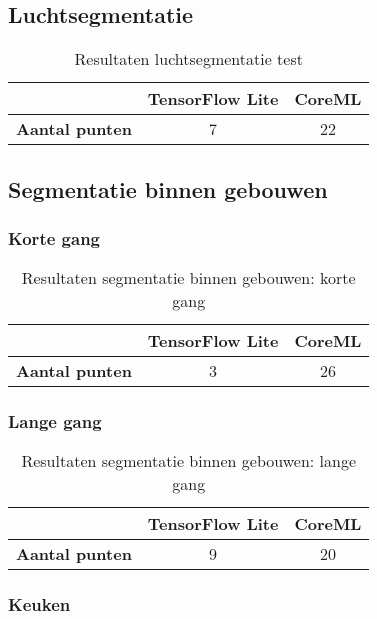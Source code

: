\subsection{Luchtsegmentatie}


\begin{table}[H]
	\centering
	\begin{tabular}{|c|c|c|}
		\hline
		& \textbf{TensorFlow Lite} & \textbf{CoreML} \\ \hline
		\textbf{Aantal punten} & 7                        & 22              \\ \hline
	\end{tabular}
	\caption{Resultaten luchtsegmentatie test}
\end{table}
\subsection{Segmentatie binnen gebouwen}

\subsubsection{Korte gang}
\begin{table}[H]
	\centering
	\begin{tabular}{|c|c|c|}
		\hline
		& \textbf{TensorFlow Lite} & \textbf{CoreML} \\ \hline
		\textbf{Aantal punten} & 3                        & 26              \\ \hline
	\end{tabular}
	\caption{Resultaten segmentatie binnen gebouwen: korte gang}
\end{table}

\subsubsection{Lange gang}
\begin{table}[H]
	\centering
	\begin{tabular}{|c|c|c|}
		\hline
		& \textbf{TensorFlow Lite} & \textbf{CoreML} \\ \hline
		\textbf{Aantal punten} & 9                        & 20              \\ \hline
	\end{tabular}
	\caption{Resultaten segmentatie binnen gebouwen: lange gang}
\end{table}

\subsubsection{Keuken}


